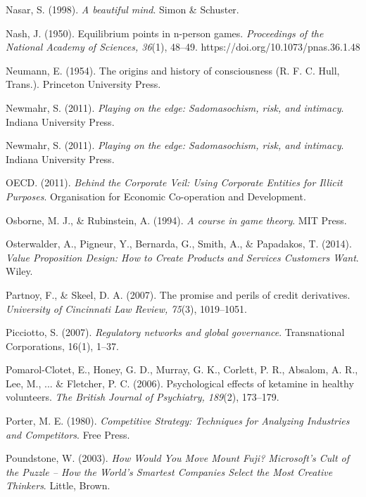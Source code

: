 \begin{thebibliography}{}
    Nasar, S. (1998). \textit{A beautiful mind}. Simon \& Schuster.

    Nash, J. (1950). Equilibrium points in n-person games. \textit{Proceedings of the National Academy of Sciences, 36}(1), 48–49. https://doi.org/10.1073/pnas.36.1.48

    Neumann, E. (1954). The origins and history of consciousness (R. F. C. Hull, Trans.). Princeton University Press.

    Newmahr, S. (2011). \textit{Playing on the edge: Sadomasochism, risk, and intimacy}. Indiana University Press.

    Newmahr, S. (2011). \textit{Playing on the edge: Sadomasochism, risk, and intimacy}. Indiana University Press.


    OECD. (2011). \textit{Behind the Corporate Veil: Using Corporate Entities for Illicit Purposes}. Organisation for Economic Co-operation and Development.

    Osborne, M. J., \& Rubinstein, A. (1994). \textit{A course in game theory}. MIT Press.

    Osterwalder, A., Pigneur, Y., Bernarda, G., Smith, A., \& Papadakos, T. (2014). \textit{Value Proposition Design: How to Create Products and Services Customers Want}. Wiley.


    Partnoy, F., \& Skeel, D. A. (2007). The promise and perils of credit derivatives. \textit{University of Cincinnati Law Review, 75}(3), 1019–1051.

    Picciotto, S. (2007). \textit{Regulatory networks and global governance}. Transnational Corporations, 16(1), 1–37.

    Pomarol-Clotet, E., Honey, G. D., Murray, G. K., Corlett, P. R., Absalom, A. R., Lee, M., ... \& Fletcher, P. C. (2006). Psychological effects of ketamine in healthy volunteers. \textit{The British Journal of Psychiatry, 189}(2), 173–179.

    Porter, M. E. (1980). \textit{Competitive Strategy: Techniques for Analyzing Industries and Competitors}. Free Press.

    Poundstone, W. (2003). \textit{How Would You Move Mount Fuji? Microsoft's Cult of the Puzzle -- How the World's Smartest Companies Select the Most Creative Thinkers}. Little, Brown.


\end{thebibliography}
